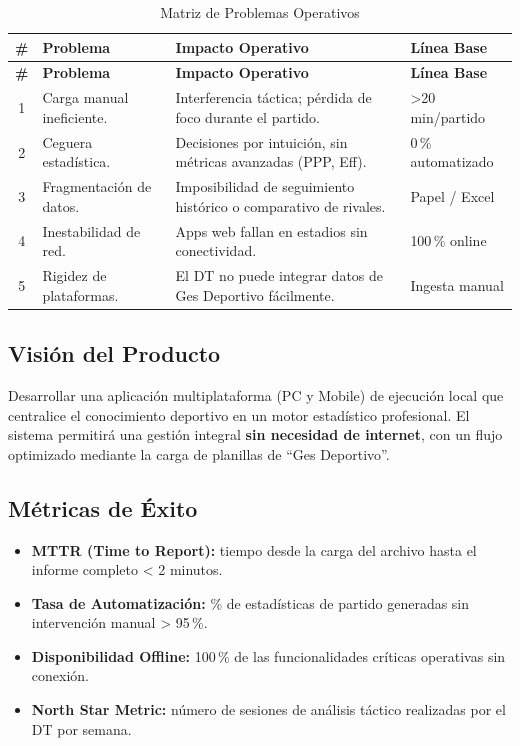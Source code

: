 \documentclass[11pt,a4paper]{article}
\begin{document}
\vspace{6pt}
\begin{longtable}{>{\small}c >{\small}p{4.6cm} >{\small}p{4.6cm} >{\small}l}
\caption{Matriz de Problemas Operativos} \\
\toprule
\rowcolor{headergray}
\textbf{\#} & \textbf{Problema} & \textbf{Impacto Operativo} & \textbf{Línea Base} \\
\midrule
\endfirsthead
\toprule
\rowcolor{headergray}
\textbf{\#} & \textbf{Problema} & \textbf{Impacto Operativo} & \textbf{Línea Base} \\
\midrule
\endhead
1 & Carga manual ineficiente. & Interferencia táctica; pérdida de foco durante el partido. & >20 min/partido \\
\rowcolor{headergray}
2 & Ceguera estadística. & Decisiones por intuición, sin métricas avanzadas (PPP, Eff). & 0\,\% automatizado \\
3 & Fragmentación de datos. & Imposibilidad de seguimiento histórico o comparativo de rivales. & Papel / Excel \\
\rowcolor{headergray}
4 & Inestabilidad de red. & Apps web fallan en estadios sin conectividad. & 100\,\% online \\
5 & Rigidez de plataformas. & El DT no puede integrar datos de Ges Deportivo fácilmente. & Ingesta manual \\
\bottomrule
\end{longtable}

\subsection{Visión del Producto}
Desarrollar una aplicación multiplataforma (PC y Mobile) de ejecución local que centralice el conocimiento deportivo en un motor estadístico profesional. El sistema permitirá una gestión integral \textbf{sin necesidad de internet}, con un flujo optimizado mediante la carga de planillas de ``Ges Deportivo''.

\subsection{Métricas de Éxito}
\begin{itemize}[nosep]
  \item \textbf{MTTR (Time to Report):} tiempo desde la carga del archivo hasta el informe completo < 2 minutos.
  \item \textbf{Tasa de Automatización:} \% de estadísticas de partido generadas sin intervención manual > 95\,\%.
  \item \textbf{Disponibilidad Offline:} 100\,\% de las funcionalidades críticas operativas sin conexión.
  \item \textbf{North Star Metric:} número de sesiones de análisis táctico realizadas por el DT por semana.
\end{itemize}
\end{document}
